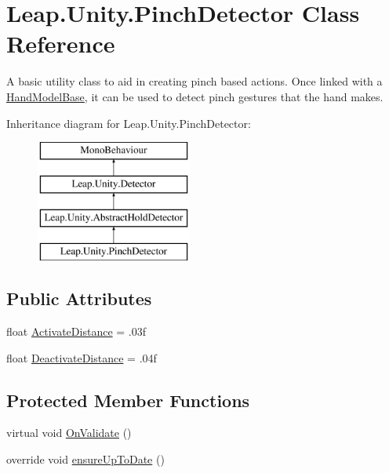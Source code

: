 \hypertarget{class_leap_1_1_unity_1_1_pinch_detector}{}\section{Leap.\+Unity.\+Pinch\+Detector Class Reference}
\label{class_leap_1_1_unity_1_1_pinch_detector}


A basic utility class to aid in creating pinch based actions. Once linked with a \mbox{\hyperlink{class_leap_1_1_unity_1_1_hand_model_base}{Hand\+Model\+Base}}, it can be used to detect pinch gestures that the hand makes.  


Inheritance diagram for Leap.\+Unity.\+Pinch\+Detector\+:\begin{figure}[H]
\begin{center}
\leavevmode
\includegraphics[height=4.000000cm]{class_leap_1_1_unity_1_1_pinch_detector}
\end{center}
\end{figure}
\subsection*{Public Attributes}
\begin{DoxyCompactItemize}
\item 
float \mbox{\hyperlink{class_leap_1_1_unity_1_1_pinch_detector_a375ceb2cb1fd8da24e4812bc45286264}{Activate\+Distance}} = .\+03f
\item 
float \mbox{\hyperlink{class_leap_1_1_unity_1_1_pinch_detector_ae5b59d436a188c81ca1a081ef64bf934}{Deactivate\+Distance}} = .\+04f
\end{DoxyCompactItemize}
\subsection*{Protected Member Functions}
\begin{DoxyCompactItemize}
\item 
virtual void \mbox{\hyperlink{class_leap_1_1_unity_1_1_pinch_detector_a6631f57f4ca5742946d509f71e8b3c1c}{On\+Validate}} ()
\item 
override void \mbox{\hyperlink{class_leap_1_1_unity_1_1_pinch_detector_aeab820b0fd278c0b8c654e5fe172be79}{ensure\+Up\+To\+Date}} ()
\end{DoxyCompactItemize}

